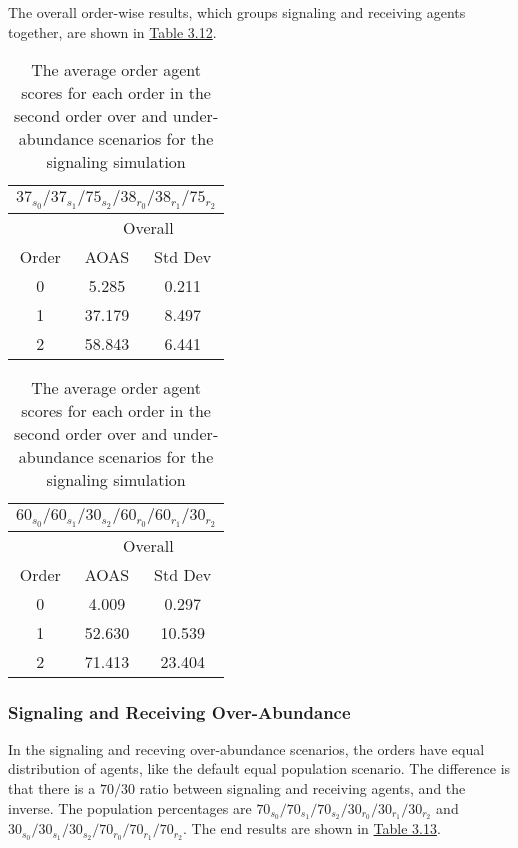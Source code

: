 The overall order-wise results, which groups signaling and receiving agents together, are shown in \hyperref[table:sig-second-order-overall]{Table 3.12}.

\begin{table}[h]
    \centering
    \begin{tabular}{|c|c|c|}
    \hline
    \multicolumn{3}{|c|}{$37_{s_{0}}/37_{s_{1}}/75_{s_{2}}/38_{r_{0}}/38_{r_{1}}/75_{r_{2}}$} \\
    \hline
    \multicolumn{1}{|c|}{} & \multicolumn{2}{|c|}{Overall} \\
    \hline
    Order & AOAS & Std Dev \\
    \hline
    0     & 5.285   & 0.211    \\
    1     & 37.179  & 8.497   \\
    2     & 58.843  & 6.441   \\
    \hline
    \end{tabular}
    \qquad
    \begin{tabular}{|c|c|c|}
    \hline
    \multicolumn{3}{|c|}{$60_{s_{0}}/60_{s_{1}}/30_{s_{2}}/60_{r_{0}}/60_{r_{1}}/30_{r_{2}}$} \\
    \hline
    \multicolumn{1}{|c|}{} & \multicolumn{2}{|c|}{Overall} \\
    \hline
    Order & AOAS & Std Dev \\
    \hline
    0     & 4.009   & 0.297    \\
    1     & 52.630  & 10.539   \\
    2     & 71.413  & 23.404   \\
    \hline
    \end{tabular}
    \caption{The average order agent scores for each order in the second order over and under-abundance scenarios for the signaling simulation}
    \label{table:sig-second-order-overall}
\end{table}

\subsubsection{Signaling and Receiving Over-Abundance}

In the signaling and receving over-abundance scenarios, the orders have equal distribution of agents, like the default equal population scenario. The difference is that there is a $70/30$ ratio between signaling and receiving agents, and the inverse. The population percentages are $70_{s_{0}}/70_{s_{1}}/70_{s_{2}}/30_{r_{0}}/30_{r_{1}}/30_{r_{2}}$ and $30_{s_{0}}/30_{s_{1}}/30_{s_{2}}/70_{r_{0}}/70_{r_{1}}/70_{r_{2}}$. The end results are shown in \hyperref[table:sig-over-abundance]{Table 3.13}.


